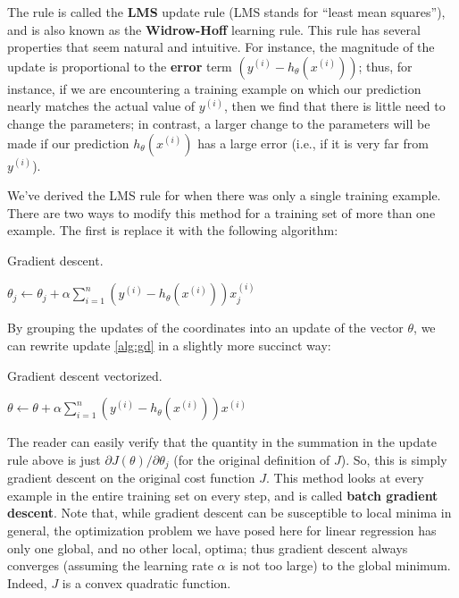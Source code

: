 The rule is called the \textbf{LMS} update rule (LMS stands for ``least mean squares''),
and is also known as the \textbf{Widrow-Hoff} learning rule. This rule has several
properties that seem natural and intuitive. For instance, the magnitude of
the update is proportional to the \textbf{error} term $(y^{(i)} - h_\theta(x^{(i)}))$; thus, for
instance, if we are encountering a training example on which our prediction
nearly matches the actual value of $y^{(i)}$, then we find that there is little need
to change the parameters; in contrast, a larger change to the parameters will
be made if our prediction $h_\theta(x^{(i)})$ has a large error (i.e., if it is very far from
$y^{(i)}$).

We've derived the LMS rule for when there was only a single training %
example. There are two ways to modify this method for a training set of
more than one example. The first is replace it with the following algorithm:

\begin{algorithm}[ht]
    \caption{Gradient descent.}
    \label{alg:gd}
    \begin{algorithmic}
    \Repeat
            \State $\theta_j \leftarrow \theta_j + \alpha \displaystyle\sum\limits_{i=1}^n \left( y^{(i)} - h_\theta(x^{(i)}) \right) x^{(i)}_j$ %
        \EndFor
    \end{algorithmic}
\end{algorithm}

By grouping the updates of the coordinates into an update of the vector
$\theta$, we can rewrite update \cref{alg:gd} in a slightly more succinct way:

\begin{algorithm}[ht]
    \caption{Gradient descent vectorized.}
    \label{alg:gd_vector}
    \begin{algorithmic}
    \Repeat
        \State $\theta \leftarrow \theta + \alpha \displaystyle\sum\limits_{i=1}^n \left( y^{(i)} - h_\theta(x^{(i)}) \right) x^{(i)}$
    \end{algorithmic}
\end{algorithm}

The reader can easily verify that the quantity in the summation in the
update rule above is just $\partial J(\theta) / \partial \theta_j$ (for the original definition of $J$).
So, this is simply gradient descent on the original cost function $J$. This method looks
at every example in the entire training set on every step, and is called \textbf{batch gradient descent}.
Note that, while gradient descent can be susceptible
to local minima in general, the optimization problem we have posed here
for linear regression has only one global, and no other local, optima; thus
gradient descent always converges (assuming the learning rate $\alpha$ is not too
large) to the global minimum. Indeed, $J$ is a convex quadratic function.


